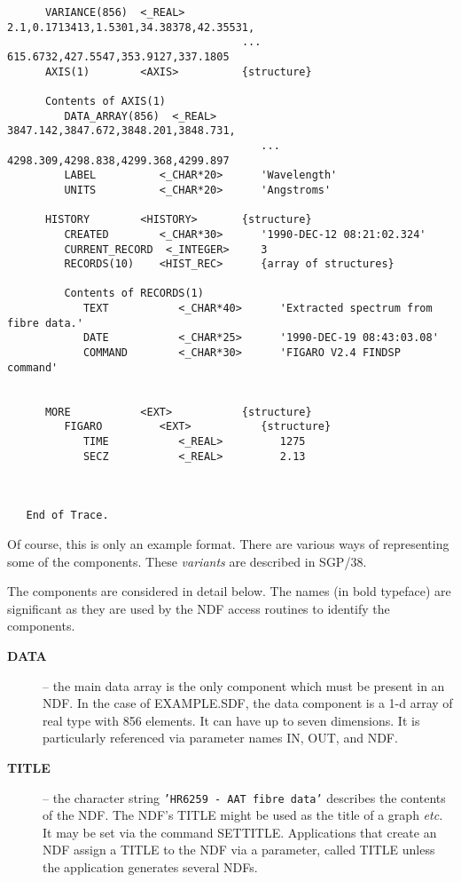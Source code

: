 {\begin{verbatim}
      VARIANCE(856)  <_REAL>         2.1,0.1713413,1.5301,34.38378,42.35531,
                                     ... 615.6732,427.5547,353.9127,337.1805
      AXIS(1)        <AXIS>          {structure}

      Contents of AXIS(1)
         DATA_ARRAY(856)  <_REAL>       3847.142,3847.672,3848.201,3848.731,
                                        ... 4298.309,4298.838,4299.368,4299.897
         LABEL          <_CHAR*20>      'Wavelength'
         UNITS          <_CHAR*20>      'Angstroms'

      HISTORY        <HISTORY>       {structure}
         CREATED        <_CHAR*30>      '1990-DEC-12 08:21:02.324'
         CURRENT_RECORD  <_INTEGER>     3
         RECORDS(10)    <HIST_REC>      {array of structures}

         Contents of RECORDS(1)
            TEXT           <_CHAR*40>      'Extracted spectrum from fibre data.'
            DATE           <_CHAR*25>      '1990-DEC-19 08:43:03.08'
            COMMAND        <_CHAR*30>      'FIGARO V2.4 FINDSP command'


      MORE           <EXT>           {structure}
         FIGARO         <EXT>           {structure}
            TIME           <_REAL>         1275
            SECZ           <_REAL>         2.13



   End of Trace.
\end{verbatim}

Of course, this is only an example format. There are various ways of
representing some of the components. These {\sl variants\/} are
described in SGP/38. 

The components are considered in detail below. The names (in bold
typeface) are significant as they are used by the NDF access routines to
identify the components. 

\begin{description}

\item[{\bf DATA}] -- the main data array is the only 
component which must be present in an NDF. 
In the case of EXAMPLE.SDF, the data component is a 1-d 
array of real type with 856 elements.  It can have up to seven 
dimensions.   It is particularly referenced via parameter names IN, OUT,
and NDF.

\item[{\bf TITLE}] -- the  character string {\tt 'HR6259 - AAT fibre 
data'} describes the contents of the NDF. The NDF's TITLE
might be used as the title of a graph {\it etc.}  It may be set
via the command SETTITLE.  Applications that create an NDF assign
a TITLE to the NDF via a parameter, called TITLE unless the application
generates several NDFs.


\end{description}}

